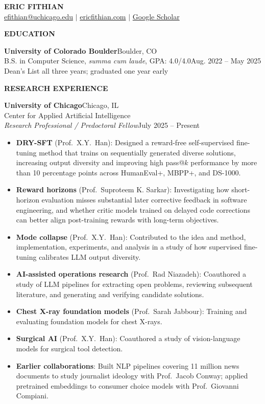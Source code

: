 \documentclass[11pt,letterpaper]{article}
\newcommand{\resumesection}[1]{%
  \par\addvspace{1.25ex}\Needspace{4\baselineskip}%
  {\bfseries #1}\par\nobreak\vspace{0.6ex}%
}
\begin{document}
\begin{center}
  {\LARGE\textbf{ERIC FITHIAN}}\\[0.4em]
  \href{mailto:efithian@uchicago.edu}{efithian@uchicago.edu}
  \quad $|$ \quad \href{https://ericfithian.com}{ericfithian.com}
  \quad $|$ \quad \href{https://scholar.google.com/citations?user=elXzya4AAAAJ\&hl=en}{Google Scholar}
\end{center}

\resumesection{EDUCATION}
\textbf{University of Colorado Boulder}\hfill Boulder, CO\\
B.S. in Computer Science, \textit{summa cum laude}, GPA: 4.0/4.0\hfill Aug. 2022 -- May 2025\\
Dean's List all three years; graduated one year early

\resumesection{RESEARCH EXPERIENCE}
\textbf{University of Chicago}\hfill Chicago, IL\\
Center for Applied Artificial Intelligence\\
\textit{Research Professional / Predoctoral Fellow}\hfill July 2025 -- Present
\begin{itemize}
  \item \textbf{DRY-SFT} (Prof.~X.Y.~Han): Designed a reward-free self-supervised fine-tuning method that trains on sequentially generated diverse solutions, increasing output diversity and improving high pass@$k$ performance by more than 10 percentage points across HumanEval+, MBPP+, and DS-1000.
  \item \textbf{Reward horizons} (Prof.~Suproteem K. Sarkar): Investigating how short-horizon evaluation misses substantial later corrective feedback in software engineering, and whether critic models trained on delayed code corrections can better align post-training rewards with long-term objectives.
  \item \textbf{Mode collapse} (Prof.~X.Y.~Han): Contributed to the idea and method, implementation, experiments, and analysis in a study of how supervised fine-tuning calibrates LLM output diversity.
  \item \textbf{AI-assisted operations research} (Prof.~Rad Niazadeh): Coauthored a study of LLM pipelines for extracting open problems, reviewing subsequent literature, and generating and verifying candidate solutions.
  \item \textbf{Chest X-ray foundation models} (Prof.~Sarah Jabbour): Training and evaluating foundation models for chest X-rays.
  \item \textbf{Surgical AI} (Prof.~X.Y.~Han): Coauthored a study of vision-language models for surgical tool detection.
  \item \textbf{Earlier collaborations}: Built NLP pipelines covering 11 million news documents to study journalist ideology with Prof.~Jacob Conway; applied pretrained embeddings to consumer choice models with Prof.~Giovanni Compiani.
\end{itemize}
\end{document}
